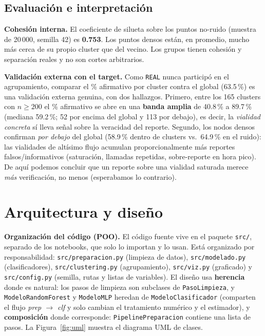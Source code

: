 \documentclass[11pt,letterpaper]{article}
\begin{document}
\subsection{Evaluación e interpretación}

\textbf{Cohesión interna.} El coeficiente de silueta sobre los puntos no-ruido
(muestra de 20\,000, semilla 42) es \textbf{0.753}. Los puntos densos están,
en promedio, mucho más cerca de su propio cluster que del vecino. Los grupos
tienen cohesión y separación reales y no son cortes arbitrarios.

\textbf{Validación externa con el target.} Como \texttt{REAL} nunca participó
en el agrupamiento, comparar el \% afirmativo por cluster contra el global
(63.5\,\%) es una validación externa genuina, con dos hallazgos.
Primero, entre los 165 clusters con $n \geq 200$ el \% afirmativo se abre en una
\textbf{banda amplia} de 40.8\,\% a 89.7\,\% (mediana 59.2\,\%; 52 por encima
del global y 113 por debajo), es decir, la \emph{vialidad concreta} sí lleva
señal sobre la veracidad del reporte. Segundo, los nodos densos confirman
\emph{por debajo} del global (58.9\,\% dentro de clusters vs.\ 64.9\,\% en el
ruido): las vialidades de altísimo flujo acumulan proporcionalmente más
reportes falsos/informativos (saturación, llamadas repetidas, sobre-reporte en
hora pico). De aquí podemos concluir que un reporte
sobre una vialidad saturada merece \emph{más} verificación, no menos (esperabamos lo contrario).

\section{Arquitectura y diseño}

\textbf{Organización del código (POO).} El código fuente vive en el paquete
\texttt{src/}, separado de los notebooks, que solo lo importan y lo usan. Está
organizado por responsabilidad: \texttt{src/preparacion.py} (limpieza de
datos), \texttt{src/modelado.py} (clasificadores), \texttt{src/clustering.py}
(agrupamiento), \texttt{src/viz.py} (graficado) y \texttt{src/config.py}
(semilla, rutas y listas de variables). El diseño usa \textbf{herencia} donde
es natural: los pasos de limpieza son subclases de \texttt{PasoLimpieza}, y
\texttt{ModeloRandomForest} y \texttt{ModeloMLP} heredan de
\texttt{ModeloClasificador} (comparten el flujo \emph{prep $\rightarrow$ clf} y
solo cambian el tratamiento numérico y el estimador), y \textbf{composición}
donde corresponde: \texttt{PipelinePreparacion} contiene una lista de pasos. La
Figura~\ref{fig:uml} muestra el diagrama UML de clases.
\end{document}
